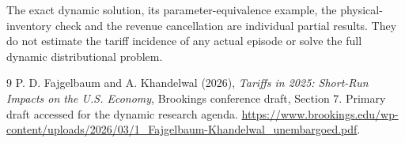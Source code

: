 \documentclass[11pt,a4paper]{article}
\begin{document}
The exact dynamic solution, its parameter-equivalence example, the physical-inventory check and the revenue cancellation are individual partial results. They do not estimate the tariff incidence of any actual episode or solve the full dynamic distributional problem.

\begin{thebibliography}{9}
 P. D. Fajgelbaum and A. Khandelwal (2026), \emph{Tariffs in 2025: Short-Run Impacts on the U.S. Economy}, Brookings conference draft, Section 7. Primary draft accessed for the dynamic research agenda. \url{https://www.brookings.edu/wp-content/uploads/2026/03/1_Fajgelbaum-Khandelwal_unembargoed.pdf}.
\end{thebibliography}
\end{document}
